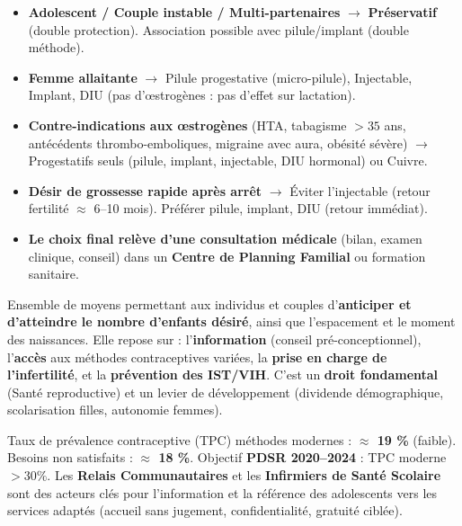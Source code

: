 \documentclass[11pt]{article}
\newcounter{popsec}
\newcounter{popsub}
\newcommand{\courssub}[1]{%
  \stepcounter{popsub}%
  \par\vspace{9pt}\noindent{\popxbold\fontsize{11.5}{13}\selectfont\color{popink}{\color{poporange}\thepopsec.\thepopsub}\hspace{6pt}#1}\par\nopagebreak\vspace{4pt}
}
\begin{document}
\begin{attention}
\begin{itemize}
\item \textbf{Adolescent / Couple instable / Multi-partenaires} $\rightarrow$ \textbf{Préservatif} (double protection). Association possible avec pilule/implant (double méthode).
\item \textbf{Femme allaitante} $\rightarrow$ Pilule progestative (micro-pilule), Injectable, Implant, DIU (pas d'œstrogènes : pas d'effet sur lactation).
\item \textbf{Contre-indications aux œstrogènes} (HTA, tabagisme $> 35$ ans, antécédents thrombo-emboliques, migraine avec aura, obésité sévère) $\rightarrow$ Progestatifs seuls (pilule, implant, injectable, DIU hormonal) ou Cuivre.
\item \textbf{Désir de grossesse rapide après arrêt} $\rightarrow$ Éviter l'injectable (retour fertilité $\approx$ 6--10 mois). Préférer pilule, implant, DIU (retour immédiat).
\item \textbf{Le choix final relève d'une consultation médicale} (bilan, examen clinique, conseil) dans un \textbf{Centre de Planning Familial} ou formation sanitaire.
\end{itemize}
\end{attention}

\courssub{Planification familiale}

\begin{definition}
Ensemble de moyens permettant aux individus et couples d'\textbf{anticiper et d'atteindre le nombre d'enfants désiré}, ainsi que l'espacement et le moment des naissances. Elle repose sur : l'\textbf{information} (conseil pré-conceptionnel), l'\textbf{accès} aux méthodes contraceptives variées, la \textbf{prise en charge de l'infertilité}, et la \textbf{prévention des IST/VIH}. C'est un \textbf{droit fondamental} (Santé reproductive) et un levier de développement (dividende démographique, scolarisation filles, autonomie femmes).
\end{definition}

\begin{savaistu}
Taux de prévalence contraceptive (TPC) méthodes modernes : \textbf{$\approx$ 19 \%} (faible). Besoins non satisfaits : \textbf{$\approx$ 18 \%}. Objectif \textbf{PDSR 2020--2024} : TPC moderne $> 30 \%$. Les \textbf{Relais Communautaires} et les \textbf{Infirmiers de Santé Scolaire} sont des acteurs clés pour l'information et la référence des adolescents vers les services adaptés (accueil sans jugement, confidentialité, gratuité ciblée).
\end{savaistu}
\end{document}
